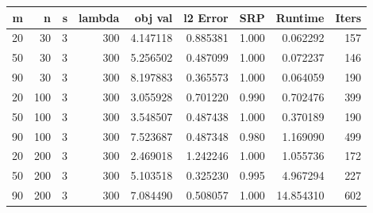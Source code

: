 \begin{tabular}{rrrrrrrrr}
\toprule
 m &   n &  s &  lambda &  obj val &  l2 Error &   SRP &   Runtime &  Iters \\
\midrule
20 &  30 &  3 &     300 & 4.147118 &  0.885381 & 1.000 &  0.062292 &    157 \\
50 &  30 &  3 &     300 & 5.256502 &  0.487099 & 1.000 &  0.072237 &    146 \\
90 &  30 &  3 &     300 & 8.197883 &  0.365573 & 1.000 &  0.064059 &    190 \\
20 & 100 &  3 &     300 & 3.055928 &  0.701220 & 0.990 &  0.702476 &    399 \\
50 & 100 &  3 &     300 & 3.548507 &  0.487438 & 1.000 &  0.370189 &    190 \\
90 & 100 &  3 &     300 & 7.523687 &  0.487348 & 0.980 &  1.169090 &    499 \\
20 & 200 &  3 &     300 & 2.469018 &  1.242246 & 1.000 &  1.055736 &    172 \\
50 & 200 &  3 &     300 & 5.103518 &  0.325230 & 0.995 &  4.967294 &    227 \\
90 & 200 &  3 &     300 & 7.084490 &  0.508057 & 1.000 & 14.854310 &    602 \\
\bottomrule
\end{tabular}

